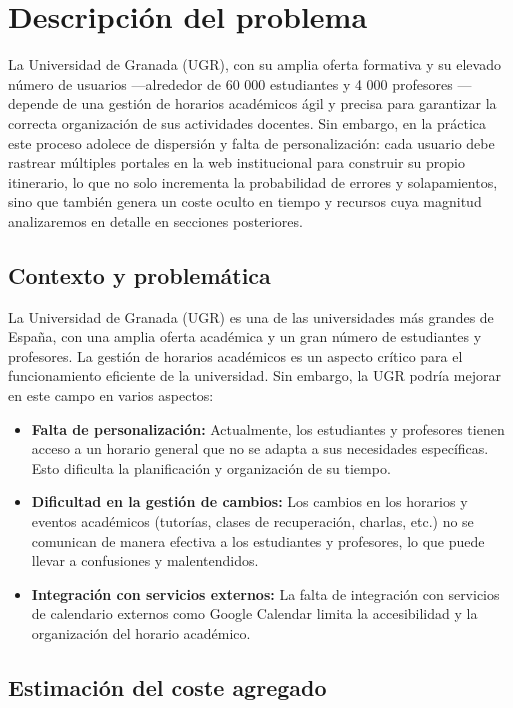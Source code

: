 \chapter{Descripción del problema}\label{cap:descripcion}

La Universidad de Granada (UGR), con su amplia oferta formativa y su elevado número de usuarios —alrededor de 60 000 estudiantes y 4 000 profesores \cite{webPromocionUGR}— depende de una gestión de horarios académicos ágil y precisa para garantizar la correcta organización de sus actividades docentes. Sin embargo, en la práctica este proceso adolece de dispersión y falta de personalización: cada usuario debe rastrear múltiples portales en la web institucional para construir su propio itinerario, lo que no solo incrementa la probabilidad de errores y solapamientos, sino que también genera un coste oculto en tiempo y recursos cuya magnitud analizaremos en detalle en secciones posteriores.

\section{Contexto y problemática}

La Universidad de Granada (UGR) es una de las universidades más grandes de España, con una amplia oferta académica y un gran número de estudiantes y profesores. La gestión de horarios académicos es un aspecto crítico para el funcionamiento eficiente de la universidad. Sin embargo, la UGR podría mejorar en este campo en varios aspectos:

\begin{itemize}
    \item \textbf{Falta de personalización:} Actualmente, los estudiantes y profesores tienen acceso a un horario general que no se adapta a sus necesidades específicas. Esto dificulta la planificación y organización de su tiempo.
    \item \textbf{Dificultad en la gestión de cambios:} Los cambios en los horarios y eventos académicos (tutorías, clases de recuperación, charlas, etc.) no se comunican de manera efectiva a los estudiantes y profesores, lo que puede llevar a confusiones y malentendidos.
    \item \textbf{Integración con servicios externos:} La falta de integración con servicios de calendario externos como Google Calendar limita la accesibilidad y la organización del horario académico.
\end{itemize}

\section{Estimación del coste agregado}


